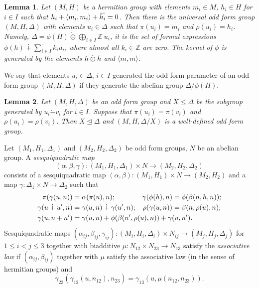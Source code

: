 \documentclass{article}
\newtheorem{lemma}{Lemma}
\theoremstyle{definition}
\newcommand{\dotminus}{\mathbin{\dot{-}}}
\newcommand{\dotoplus}{\mathbin{\dot{\oplus}}}
\newcommand{\leqt}{\trianglelefteq}
\newcommand{\inv}[1]{
    \!\;\overline{
        \!\!\:#1\vphantom !\!\!\:
    }\;\!
}
\begin{document}
\begin{lemma} \label{ofg-free}
    Let \((M, H)\) be a hermitian group with elements \(m_i \in M\), \(h_i \in H\) for \(i \in I\) such that \(
        h_i + \langle m_i, m_i \rangle + \inv{h_i} = 0
    \). Then there is the universal odd form group \(
        (M, H, \Delta)
    \) with elements \(u_i \in \Delta\) such that \(
        \pi(u_i) = m_i
    \) and \(
        \rho(u_i) = h_i
    \). Namely, \(
        \Delta
        =
        \phi(H)
        \dotoplus \bigoplus^\cdot_{i \in I}
            \mathbb Z^\cdot u_i
    \), it is the set of formal expressions \(
        \phi(h)
        \dotplus \sum_{i \in I}^\cdot
            k_i^\cdot u_i
    \), where almost all \(k_i \in \mathbb Z\) are zero. The kernel of \(\phi\) is generated by the elements \(
        h \dotoplus \inv h
    \) and \(
        \langle m, m \rangle
    \).
\end{lemma}

We say that elements \(u_i \in \Delta\), \(i \in I\) generated the odd form parameter of an odd form group \(
    (M, H, \Delta)
\) if they generate the abelian group \(
    \Delta / \phi(H)
\).

\begin{lemma} \label{ofg-fact}
    Let \(
        (M, H, \Delta)
    \) be an odd form group and \(X \leq \Delta\) be the subgroup generated by \(
        u_i \dotminus v_i
    \) for \(i \in I\). Suppose that \(
        \pi(u_i) = \pi(v_i)
    \) and \(
        \rho(u_i) = \rho(v_i)
    \). Then \(
        X \leqt \Delta
    \) and \(
        (M, H, \Delta / X)
    \) is a well-defined odd form group.
\end{lemma}

Let \(
    (M_1, H_1, \Delta_1)
\) and \(
    (M_2, H_2, \Delta_2)
\) be odd form groups, \(N\) be an abelian group. A \textit{sesquiquadratic map} \[
    (\alpha, \beta, \gamma)
    \colon (M_1, H_1, \Delta_1) \times N
    \to (M_2, H_2, \Delta_2)
\] consists of a sesquiquadratic map \(
    (\alpha, \beta)
    \colon (M_1, H_1) \times N
    \to (M_2, H_2)
\) and a map \(
    \gamma \colon \Delta_1 \times N \to \Delta_2
\) such that
\begin{align*}
    \pi(\gamma(u, n)) &= \alpha(\pi(u), n);
    &
    \gamma(\phi(h), n) &= \phi(\beta(n, h, n));
    \\
    \gamma(u \dotplus u', n)
    &=
    \gamma(u, n) \dotplus \gamma(u', n);
    &
    \rho(\gamma(u, n)) &= \beta(n, \rho(u), n);
    \\
    \gamma(u, n + n')
    &=
    \gamma(u, n)
    \dotplus \phi(\beta(n', \rho(u), n))
    \dotplus \gamma(u, n').\mkern-200mu
\end{align*}
Sesquiquadratic maps \(
    (\alpha_{ij}, \beta_{ij}, \gamma_{ij})
    \colon (M_i, H_i, \Delta_i) \times N_{ij}
    \to (M_j, H_j, \Delta_j)
\) for \(1 \leq i < j \leq 3\) together with biadditive \(
    \mu \colon N_{12} \times N_{23} \to N_{13}
\) satisfy the \textit{associative law} if \(
    (\alpha_{ij}, \beta_{ij})
\) together with \(\mu\) satisfy the associative law (in the sense of hermitian groups) and \[
    \gamma_{23}(\gamma_{12}(u, n_{12}), n_{23})
    =
    \gamma_{13}(u, \mu(n_{12}, n_{23})).
\]
\end{document}
